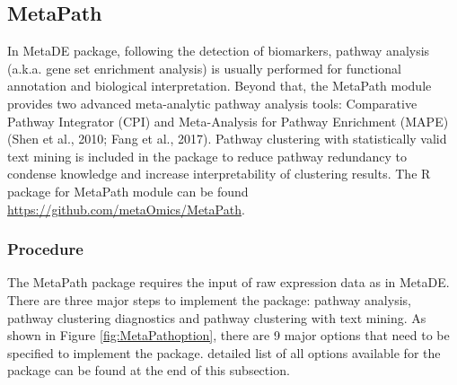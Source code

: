 \subsection{MetaPath}

In MetaDE package,
following the detection of biomarkers, pathway analysis (a.k.a. gene set enrichment analysis) is usually performed for functional annotation and biological interpretation. 
Beyond that, the MetaPath module provides two advanced meta-analytic pathway analysis tools: 
Comparative Pathway Integrator (CPI) and Meta-Analysis for Pathway Enrichment (MAPE) (Shen et al., 2010; Fang et al., 2017). 
Pathway clustering with statistically valid text mining is included in the package to reduce pathway redundancy to condense knowledge and increase interpretability of clustering results. 
The R package for MetaPath module can be found \url{https://github.com/metaOmics/MetaPath}.

\subsubsection{Procedure}
The MetaPath package requires the input of raw expression data as in MetaDE. 
There are three major steps to implement the package: pathway analysis, pathway clustering diagnostics and pathway clustering with text mining. 
As shown in Figure \ref{fig:MetaPathoption}, there are 9 major options that need to be specified to implement the package.
 detailed list of all options available for the package can be found at the end of this subsection. 


